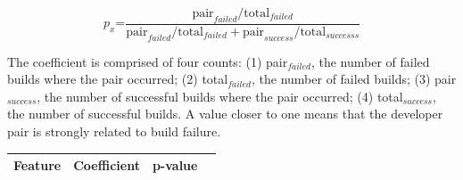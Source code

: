 \begin{equation}
p_x\text{=}\frac{ \text{pair}_{failed} / \text{total}_{failed} }
                     { \text{pair}_{failed} / \text{total}_{failed} + \text{pair}_{success} / \text{total}_{successs}}
\end{equation}

The coefficient is comprised of four counts: (1) pair$_{failed}$, the number of failed builds where the pair occurred; (2) total$_{failed}$, the number of failed builds; (3) pair$_{success}$, the number of successful builds where the pair occurred; (4) total$_{success}$, the number of successful builds.
A value closer to one means that the developer pair is strongly related to build
failure.



\begin{table}[t!]
\centering
\begin{tabular}{cccc}
\toprule
Feature & Coefficient & p-value & \\
\midrule

\end{tabular}
\end{table}
